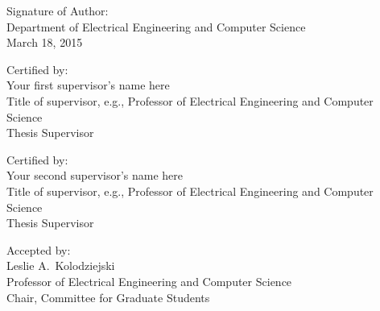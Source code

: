 \vspace{.3in}

\noindent
Signature of Author: \underline{\mbox{\hspace{4.28in}}} \\
\vspace{-.25in}
{\flushright Department of Electrical Engineering and Computer Science \\
March 18, 2015\\
}

\vspace{.15in}

\noindent
Certified by: \underline{\mbox{\hspace{4.827in}}} \\
\vspace{-.25in}
{\flushright Your first supervisor's name here \\
Title of supervisor, e.g., Professor of Electrical Engineering and Computer Science \\
Thesis Supervisor \\
}

\vspace{.15in}

\noindent
Certified by: \underline{\mbox{\hspace{4.827in}}} \\
\vspace{-.25in}
{\flushright Your second supervisor's name here \\
Title of supervisor, e.g., Professor of Electrical Engineering and Computer Science \\
Thesis Supervisor \\
}

\vspace{.15in}

\noindent
Accepted by: \underline{\mbox{\hspace{4.79in}}} \\
\vspace{-.25in}
{\flushright Leslie A.~Kolodziejski \\
Professor of Electrical Engineering and Computer Science \\
Chair, Committee for Graduate Students \\
}

\cleardoublepage
